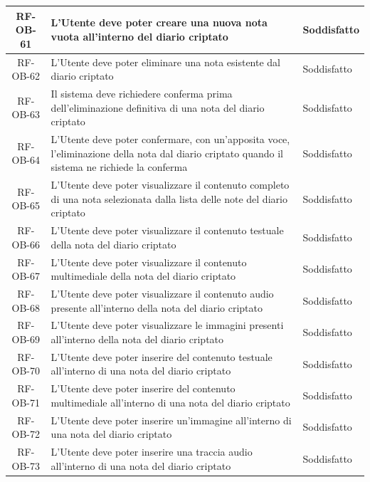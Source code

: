 \documentclass[a4paper,12pt]{article}
\begin{document}
\begin{center}
\begin{longtable}{|c|p{8.5cm}|>{\centering\arraybackslash}p{4cm}|}
RF-OB-61 & L'Utente deve poter creare una nuova nota vuota all'interno del diario criptato & Soddisfatto \\
\hline

RF-OB-62 & L'Utente deve poter eliminare una nota esistente dal diario criptato & Soddisfatto \\
\hline

RF-OB-63 & Il sistema deve richiedere conferma prima dell'eliminazione definitiva di una nota del diario criptato & Soddisfatto \\
\hline

RF-OB-64 & L'Utente deve poter confermare, con un'apposita voce, l'eliminazione della nota dal diario criptato quando il sistema ne richiede la conferma & Soddisfatto \\
\hline

RF-OB-65 & L'Utente deve poter visualizzare il contenuto completo di una nota selezionata dalla lista delle note del diario criptato & Soddisfatto \\
\hline

RF-OB-66 & L'Utente deve poter visualizzare il contenuto testuale della nota del diario criptato & Soddisfatto \\
\hline

RF-OB-67 & L'Utente deve poter visualizzare il contenuto multimediale della nota del diario criptato & Soddisfatto \\
\hline

RF-OB-68 & L'Utente deve poter visualizzare il contenuto audio presente all'interno della nota del diario criptato & Soddisfatto \\
\hline

RF-OB-69 & L'Utente deve poter visualizzare le immagini presenti all'interno della nota del diario criptato & Soddisfatto \\
\hline

RF-OB-70 & L'Utente deve poter inserire del contenuto testuale all'interno di una nota del diario criptato & Soddisfatto \\
\hline

RF-OB-71 & L'Utente deve poter inserire del contenuto multimediale all'interno di una nota del diario criptato & Soddisfatto \\
\hline

RF-OB-72 & L'Utente deve poter inserire un'immagine all'interno di una nota del diario criptato & Soddisfatto \\
\hline

RF-OB-73 & L'Utente deve poter inserire una traccia audio all'interno di una nota del diario criptato & Soddisfatto \\
\hline


\end{longtable}
\end{center}
\end{document}
